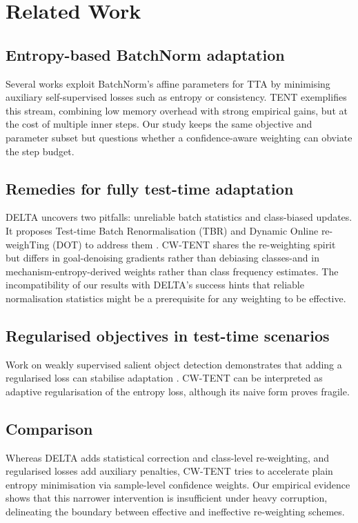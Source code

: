 \documentclass{article} %
\begin{document}
\section{Related Work}
\label{sec:related}
\subsection{Entropy-based BatchNorm adaptation}
Several works exploit BatchNorm's affine parameters for TTA by minimising auxiliary self-supervised losses such as entropy or consistency. TENT exemplifies this stream, combining low memory overhead with strong empirical gains, but at the cost of multiple inner steps. Our study keeps the same objective and parameter subset but questions whether a confidence-aware weighting can obviate the step budget.

\subsection{Remedies for fully test-time adaptation}
DELTA uncovers two pitfalls: unreliable batch statistics and class-biased updates. It proposes Test-time Batch Renormalisation (TBR) and Dynamic Online re-weighTing (DOT) to address them \cite{zhao-2023-delta}. CW-TENT shares the re-weighting spirit but differs in goal-denoising gradients rather than debiasing classes-and in mechanism-entropy-derived weights rather than class frequency estimates. The incompatibility of our results with DELTA's success hints that reliable normalisation statistics might be a prerequisite for any weighting to be effective.

\subsection{Regularised objectives in test-time scenarios}
Work on weakly supervised salient object detection demonstrates that adding a regularised loss can stabilise adaptation \cite{author-year-test}. CW-TENT can be interpreted as adaptive regularisation of the entropy loss, although its naive form proves fragile.

\subsection{Comparison}
Whereas DELTA adds statistical correction and class-level re-weighting, and regularised losses add auxiliary penalties, CW-TENT tries to accelerate plain entropy minimisation via sample-level confidence weights. Our empirical evidence shows that this narrower intervention is insufficient under heavy corruption, delineating the boundary between effective and ineffective re-weighting schemes.
\end{document}
